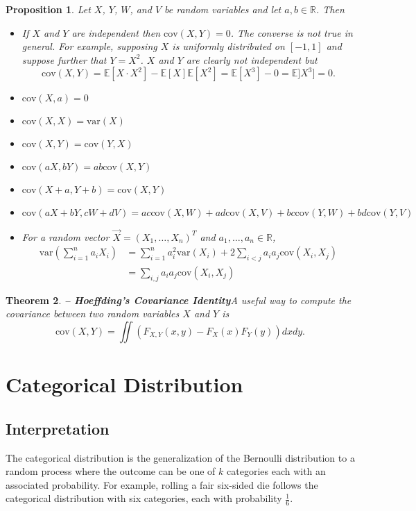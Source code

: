 \documentclass[1pt]{report}
\newtheorem{thm}{Theorem}[chapter]
\newtheorem{prop}[thm]{Proposition}
\newcommand{\Rone}{\mathbb{R}}
\newcommand{\R}{\Rone}
\newcommand{\<}{\langle}
\renewcommand{\>}{\rangle}
\newcommand{\E}{\mathbb{E}}
\newcommand{\cov}{\text{cov}}
\begin{document}
\begin{prop}\label{prop:covarianceproperties}
Let $X$, $Y$, $W$, and $V$ be random variables and let $a,b\in \R$. Then
\begin{itemize}
\item If $X$ and $Y$ are independent then $\cov(X,Y) = 0$. The converse is not true in general. For example, supposing $X$ is uniformly distributed on $[-1,1]$ and suppose further that $Y=X^2$. $X$ and $Y$ are clearly not independent but 
$$\cov(X,Y) = \E[X\cdot X^2] - \E[X]\E[X^2] = \E[X^3] - 0 = \E]X^3] = 0.$$
\item $\cov(X,a) = 0$
\item $\cov(X,X) = \text{var}(X)$
\item $\cov(X,Y) = \cov(Y,X)$
\item $\cov(aX,bY) = ab\cov(X,Y)$
\item $\cov(X+a, Y+b) = \cov(X,Y)$
\item $\cov(aX + bY, cW + dV) = ac\cov(X,W) + ad\cov(X,V) + bc\cov(Y,W) + bd\cov(Y,V)$
\item For a random vector $\vec X = (X_1, \dots, X_n)^T$ and $a_1,\dots, a_n \in \R$, 
\begin{align*}\text{var}\left(\sum\limits_{i=1}^n a_i X_i\right) &= \sum\limits_{i=1}^n a_i^2 \text{var}(X_i) + 2\sum\limits_{i<j} a_i a_j\cov(X_i, X_j) \\
&= \sum\limits_{i,j} a_i a_j \cov(X_i ,X_j)
\end{align*}
\end{itemize}
\end{prop}
\begin{thm}\textbf{ -- Hoeffding's Covariance Identity}\label{thm:covarianceidentity}
A useful way to compute the covariance between two random variables $X$ and $Y$ is
$$\cov(X,Y) = \iint \left(F_{X,Y}(x,y) - F_X(x)F_Y(y)\right)dxdy.$$
\end{thm}
\newpage
\section{Categorical Distribution}
\subsection{Interpretation}
The categorical distribution is the generalization of the Bernoulli distribution to a random process where the outcome can be one of $k$ categories each with an associated probability. For example, rolling a fair six-sided die follows the categorical distribution with six categories, each with probability $\frac{1}{6}$.
\end{document}
